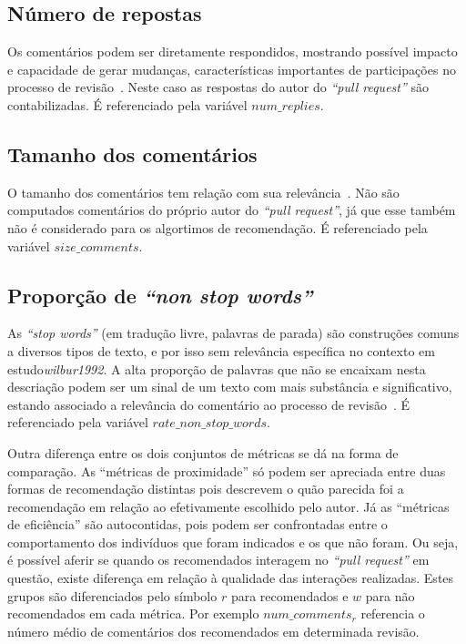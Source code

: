 \documentclass[12pt,openany,oneside,a4paper,english,brazil]{abntbibufjf}
\begin{document}
    \subsection{Número de repostas}
      Os comentários podem ser diretamente respondidos, mostrando possível impacto e capacidade de gerar mudanças, características importantes de participações no processo de revisão~\cite{bosu2015}. Neste caso as respostas do autor do \textit{``pull request''} são contabilizadas. É referenciado pela variável $num\_replies$.

    \subsection{Tamanho dos comentários}
      O tamanho dos comentários tem relação com sua relevância~\cite{rahman2017}. Não são computados comentários do próprio autor do \textit{``pull request''}, já que esse também não é considerado para os algortimos de recomendação. É referenciado pela variável $size\_comments$.


    \subsection{Proporção de \textit{``non stop words''}}
    As \textit{``stop words''} (em tradução livre, palavras de parada) são construções comuns a diversos tipos de texto, e por isso sem relevância específica no contexto em estudo\textit{wilbur1992}.
    A alta proporção de palavras que não se encaixam nesta descriação podem ser um sinal de um texto com mais substância e significativo, estando associado a relevância do comentário ao processo de revisão~\cite{rahman2017}. É referenciado pela variável $rate\_non\_stop\_words$.

    Outra diferença entre os dois conjuntos de métricas se dá na forma de comparação. As ``métricas de proximidade'' só podem ser apreciada entre duas formas de recomendação distintas pois descrevem o quão parecida foi a recomendação em relação ao efetivamente escolhido pelo autor. Já as ``métricas de eficiência'' são autocontidas, pois podem ser confrontadas entre o comportamento dos indivíduos que foram indicados e os que não foram. Ou seja, é possível aferir se quando os recomendados interagem no \textit{``pull request''} em questão, existe diferença em relação à qualidade das interações realizadas. Estes grupos são diferenciados pelo símbolo $r$ para recomendados e $w$ para não recomendados em cada métrica. Por exemplo $num\_comments_r$ referencia o número médio de comentários dos recomendados em determinada revisão.
\end{document}
